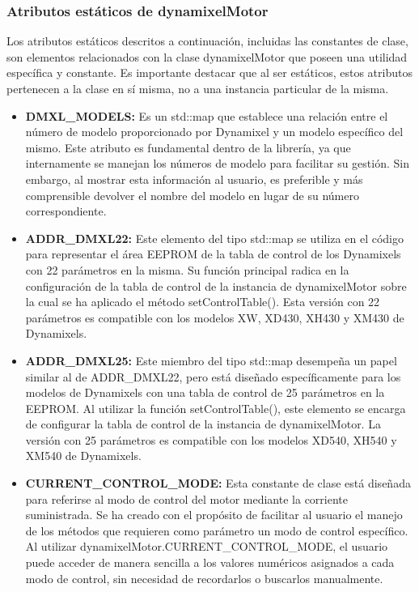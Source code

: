 \documentclass{article}
\begin{document}
\subsubsection{Atributos estáticos de dynamixelMotor}
Los atributos estáticos descritos a continuación, incluidas las constantes de clase, son elementos relacionados con la clase dynamixelMotor que poseen una utilidad específica y constante. Es importante destacar que al ser estáticos, estos atributos pertenecen a la clase en sí misma, no a una instancia particular de la misma.
\begin{itemize}
    \item \textbf{DMXL\_MODELS:} Es un std::map que establece una relación entre el número de modelo proporcionado por Dynamixel y un modelo específico del mismo. Este atributo es fundamental dentro de la librería, ya que internamente se manejan los números de modelo para facilitar su gestión. Sin embargo, al mostrar esta información al usuario, es preferible y más comprensible devolver el nombre del modelo en lugar de su número correspondiente.
    
    \item \textbf{ADDR\_DMXL22:} Este elemento del tipo std::map se utiliza en el código para representar el área EEPROM de la tabla de control de los Dynamixels con 22 parámetros en la misma. Su función principal radica en la configuración de la tabla de control de la instancia de dynamixelMotor sobre la cual se ha aplicado el método setControlTable(). Esta versión con 22 parámetros es compatible con los modelos XW, XD430, XH430 y XM430 de Dynamixels.
    
    \item \textbf{ADDR\_DMXL25:} Este miembro del tipo std::map desempeña un papel similar al de ADDR\_DMXL22, pero está diseñado específicamente para los modelos de Dynamixels con una tabla de control de 25 parámetros en la EEPROM. Al utilizar la función setControlTable(), este elemento se encarga de configurar la tabla de control de la instancia de dynamixelMotor. La versión con 25 parámetros es compatible con los modelos XD540, XH540 y XM540 de Dynamixels.

    \item \textbf{CURRENT\_CONTROL\_MODE:} Esta constante de clase está diseñada para referirse al modo de control del motor mediante la corriente suministrada. Se ha creado con el propósito de facilitar al usuario el manejo de los métodos que requieren como parámetro un modo de control específico. Al utilizar dynamixelMotor.CURRENT\_CONTROL\_MODE, el usuario puede acceder de manera sencilla a los valores numéricos asignados a cada modo de control, sin necesidad de recordarlos o buscarlos manualmente.


\end{itemize}
\end{document}
